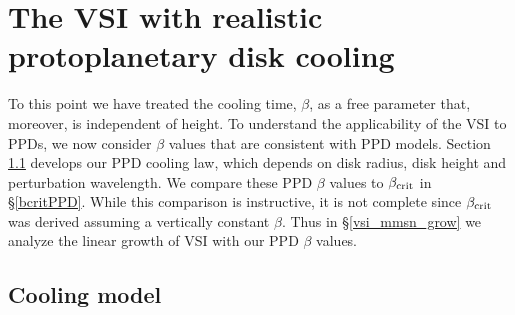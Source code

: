 \section{The VSI with realistic  protoplanetary disk cooling}\label{application} 
To this point we have treated the cooling time, $\beta$, as a free
parameter that, moreover, is independent of height.  
To understand the applicability of the VSI to PPDs, we now consider
$\beta$ values that are consistent with PPD models. 
Section \ref{cooling_model}  develops our PPD cooling law, which
depends on disk radius, disk height and perturbation wavelength. 
We compare these PPD $\beta$ values to $\beta_{\rm crit}$ in
\S\ref{bcritPPD}.  While this comparison is instructive, it is not
complete since $\beta_{\rm crit}$ was derived assuming a vertically
constant $\beta$.  Thus in \S\ref{vsi_mmsn_grow} we analyze the linear
growth of VSI with our PPD $\beta$ values. 



\subsection{Cooling model} \label{cooling_model}

